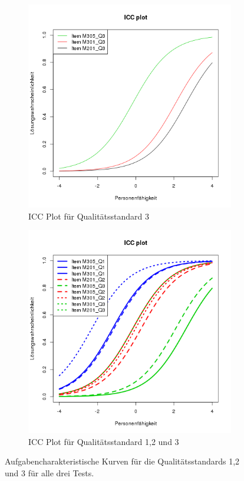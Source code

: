  \begin{figure}[htbp]
 \ContinuedFloat %
 \centering
 \begin{subfigure}{0.49\textwidth}
   \includegraphics[width=1.0\linewidth]{graphics/ICCQ3.png}
   \caption{ICC Plot für Qualitätsstandard 3}
   \label{fig:ICCQ3}
 \end{subfigure}
 \begin{subfigure}{0.49\textwidth}
   \includegraphics[width=1.0\linewidth]{graphics/ICCQ123.png}
   \caption{ICC Plot für Qualitätsstandard 1,2 und 3}
   \label{fig:ICCQ123}
 \end{subfigure}
 
 \caption{Aufgabencharakteristische Kurven für die Qualitätsstandards 1,2 und 3 für alle drei Tests.}
 \label{fig:corLev}
 \end{figure}
 
